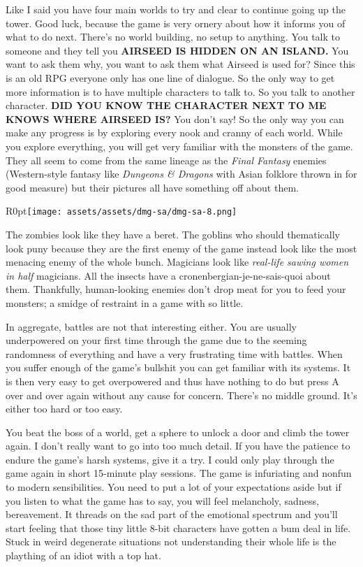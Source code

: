 \documentclass{book}
\begin{document}
Like I said you have four main worlds to try and clear to continue going up the tower. Good luck, because the game is very ornery about how it informs you of what to do next. There’s no world building, no setup to anything. You talk to someone and they tell you \textbf{AIRSEED IS HIDDEN ON AN ISLAND.} You want to ask them why, you want to ask them what Airseed is used for? Since this is an old RPG everyone only has one line of dialogue. So the only way to get more information is to have multiple characters to talk to. So you talk to another character. \textbf{DID YOU KNOW THE CHARACTER NEXT TO ME KNOWS WHERE AIRSEED IS?} You don’t say! So the only way you can make any progress is by exploring every nook and cranny of each world. While you explore everything, you will get very familiar with the monsters of the game. They all seem to come from the same lineage as the \emph{Final Fantasy} enemies (Western-style fantasy like \emph{Dungeons \& Dragons} with Asian folklore thrown in for good measure) but their pictures all have something off about them.\par
\begin{wrapfigure}{R}{0pt}{\texttt{[image: assets/assets/dmg-sa/dmg-sa-8.png]}}\end{wrapfigure}
The zombies look like they have a beret. The goblins who should thematically look puny because they are the first enemy of the game instead look like the most menacing enemy of the whole bunch. Magicians look like \emph{real-life sawing women in half} magicians. All the insects have a cronenbergian-je-ne-sais-quoi about them. Thankfully, human-looking enemies don’t drop meat for you to feed your monsters; a smidge of restraint in a game with so little.\par
In aggregate, battles are not that interesting either. You are usually underpowered on your first time through the game due to the seeming randomness of everything and have a very frustrating time with battles. When you suffer enough of the game’s bullshit you can get familiar with its systems. It is then very easy to get overpowered and thus have nothing to do but press A over and over again without any cause for concern. There’s no middle ground. It’s either too hard or too easy.\par
You beat the boss of a world, get a sphere to unlock a door and climb the tower again. I don’t really want to go into too much detail. If you have the patience to endure the game’s harsh systems, give it a try. I could only play through the game again in short 15-minute play sessions. The game is infuriating and nonfun to modern sensibilities. You need to put a lot of your expectations aside but if you listen to what the game has to say, you will feel melancholy, sadness, bereavement. It threads on the sad part of the emotional spectrum and you’ll start feeling that those tiny little 8-bit characters have gotten a bum deal in life. Stuck in weird degenerate situations not understanding their whole life is the plaything of an idiot with a top hat.\par
\end{document}
